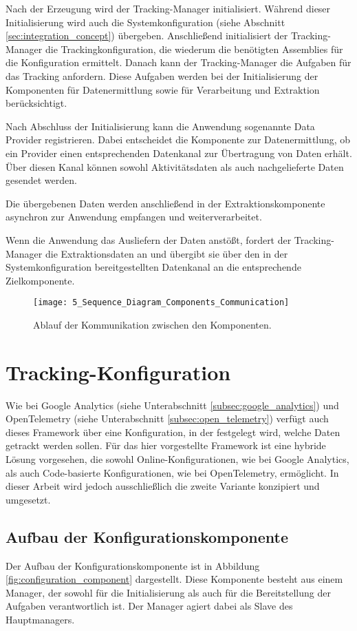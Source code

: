 Nach der Erzeugung wird der Tracking-Manager initialisiert. Während dieser Initialisierung wird auch die Systemkonfiguration (siehe Abschnitt \ref{sec:integration_concept}) übergeben. Anschließend initialisiert der Tracking-Manager die Trackingkonfiguration, die wiederum die benötigten Assemblies für die Konfiguration ermittelt. Danach kann der Tracking-Manager die Aufgaben für das Tracking anfordern. Diese Aufgaben werden bei der Initialisierung der Komponenten für Datenermittlung sowie für Verarbeitung und Extraktion berücksichtigt.

Nach Abschluss der Initialisierung kann die Anwendung sogenannte Data Provider registrieren. Dabei entscheidet die Komponente zur Datenermittlung, ob ein Provider einen entsprechenden Datenkanal zur Übertragung von Daten erhält. Über diesen Kanal können sowohl Aktivitätsdaten als auch nachgelieferte Daten gesendet werden.

Die übergebenen Daten werden anschließend in der Extraktionskomponente asynchron zur Anwendung empfangen und weiterverarbeitet.  

Wenn die Anwendung das Ausliefern der Daten anstößt, fordert der Tracking-Manager die Extraktionsdaten an und übergibt sie über den in der Systemkonfiguration bereitgestellten Datenkanal an die entsprechende Zielkomponente.

\begin{figure}[H]
    \centering
    \texttt{[image: 5\_Sequence\_Diagram\_Components\_Communication]}
    \caption{Ablauf der Kommunikation zwischen den Komponenten.}
    \label{fig:sequence_diagram_communication_components}
\end{figure}

\section{Tracking-Konfiguration}
\label{sec:configuration_concept}
Wie bei Google Analytics (siehe Unterabschnitt \ref{subsec:google_analytics}) und OpenTelemetry (siehe Unterabschnitt \ref{subsec:open_telemetry}) verfügt auch dieses Framework über eine Konfiguration, in der festgelegt wird, welche Daten getrackt werden sollen. Für das hier vorgestellte Framework ist eine hybride Lösung vorgesehen, die sowohl Online-Konfigurationen, wie bei Google Analytics, als auch Code-basierte Konfigurationen, wie bei OpenTelemetry, ermöglicht. In dieser Arbeit wird jedoch ausschließlich die zweite Variante konzipiert und umgesetzt.

\subsection{Aufbau der Konfigurationskomponente}
Der Aufbau der Konfigurationskomponente ist in Abbildung \ref{fig:configuration_component} dargestellt. Diese Komponente besteht aus einem Manager, der sowohl für die Initialisierung als auch für die Bereitstellung der Aufgaben verantwortlich ist. Der Manager agiert dabei als Slave des Hauptmanagers.

